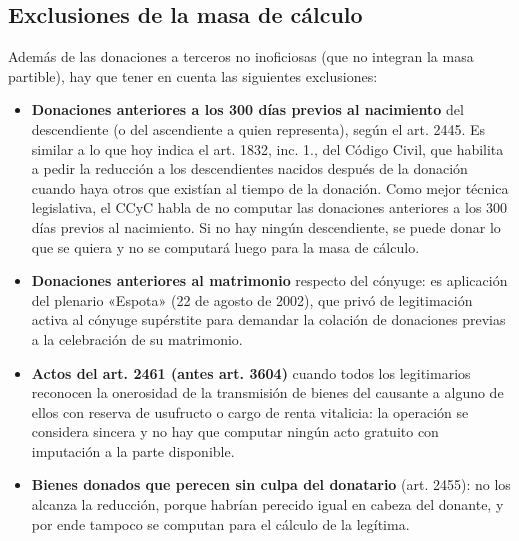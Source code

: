 \documentclass[12pt,oneside]{book}
\begin{document}
\subsection{Exclusiones de la masa de cálculo}

Además de las donaciones a terceros no inoficiosas (que no integran la masa partible), hay que tener en cuenta las siguientes exclusiones:

\begin{itemize}
    \item \textbf{Donaciones anteriores a los 300 días previos al nacimiento} del descendiente (o del ascendiente a quien representa), según el art. 2445. Es similar a lo que hoy indica el art. 1832, inc. 1.\textordmasculine{}, del Código Civil, que habilita a pedir la reducción a los descendientes nacidos después de la donación cuando haya otros que existían al tiempo de la donación. Como mejor técnica legislativa, el CCyC habla de no computar las donaciones anteriores a los 300 días previos al nacimiento. Si no hay ningún descendiente, se puede donar lo que se quiera y no se computará luego para la masa de cálculo.
    \item \textbf{Donaciones anteriores al matrimonio} respecto del cónyuge: es aplicación del plenario «Espota» (22 de agosto de 2002), que privó de legitimación activa al cónyuge supérstite para demandar la colación de donaciones previas a la celebración de su matrimonio.
    \item \textbf{Actos del art. 2461 (antes art. 3604)} cuando todos los legitimarios reconocen la onerosidad de la transmisión de bienes del causante a alguno de ellos con reserva de usufructo o cargo de renta vitalicia: la operación se considera sincera y no hay que computar ningún acto gratuito con imputación a la parte disponible.
    \item \textbf{Bienes donados que perecen sin culpa del donatario} (art. 2455): no los alcanza la reducción, porque habrían perecido igual en cabeza del donante, y por ende tampoco se computan para el cálculo de la legítima.
\end{itemize}
\end{document}

